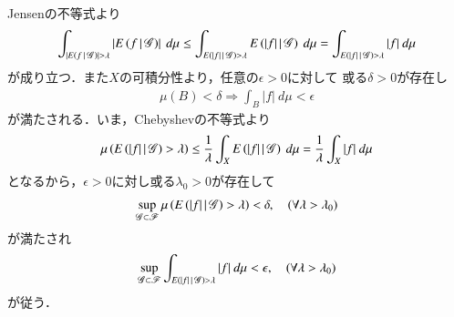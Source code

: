 	\begin{prf}
		Jensenの不等式より
				\begin{align}
					\int_{\left| \cexp{f}{\mathscr{G}} \right| > \lambda} \left| \cexp{f}{\mathscr{G}} \right|\ d\mu
					\leq \int_{\cexp{|f|}{\mathscr{G}} > \lambda} \cexp{|f|}{\mathscr{G}}\ d\mu
					= \int_{\cexp{|f|}{\mathscr{G}} > \lambda} |f|\ d\mu
				\end{align}
				が成り立つ．また$X$の可積分性より，任意の$\epsilon > 0$に対して
				或る$\delta > 0$が存在し
				\begin{align}
					\mu(B) < \delta \Rightarrow \int_B |f|\ d\mu < \epsilon
				\end{align}
				が満たされる．いま，Chebyshevの不等式より
				\begin{align}
					\mu\left( E\left( |f| \, \middle|\, \mathscr{G} \right) > \lambda \right)
					\leq \frac{1}{\lambda} \int_X E\left( |f| \, \middle|\, \mathscr{G} \right)\ d\mu
					= \frac{1}{\lambda} \int_X |f|\ d\mu
				\end{align}
				となるから，$\epsilon > 0$に対し或る$\lambda_0 > 0$が存在して
				\begin{align}
					\operatorname*{sup}_{\mathscr{G} \subset \mathscr{F}} \mu\left( E\left( |f| \, \middle|\, \mathscr{G} \right) > \lambda \right)
					< \delta,
					\quad (\forall \lambda > \lambda_0)
				\end{align}
				が満たされ
				\begin{align}
					\operatorname*{sup}_{\mathscr{G} \subset \mathscr{F}} \int_{E\left( |f| \, \middle|\, \mathscr{G} \right) > \lambda}|f|\ d\mu
					< \epsilon,
					\quad (\forall \lambda > \lambda_0)
				\end{align}
				が従う．
		\QED
	\end{prf}